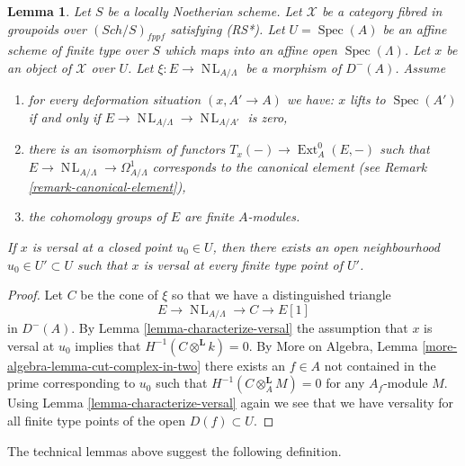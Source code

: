 \documentclass{stacks-project}
\theoremstyle{plain}
\newtheorem{lemma}[subsection]{Lemma}
\theoremstyle{definition}
\theoremstyle{remark}
\numberwithin{equation}{subsection}
\def\Spec{\mathop{\mathrm{Spec}}}
\def\Ext{\mathop{\mathrm{Ext}}\nolimits}
\def\Sch{\mathit{Sch}}
\def\NL{\mathop{N\!L}\nolimits}
\begin{document}
\begin{lemma}
\label{lemma-openness}
Let $S$ be a locally Noetherian scheme. Let $\mathcal{X}$ be a category
fibred in groupoids over $(\Sch/S)_{fppf}$ satisfying (RS*).
Let $U = \Spec(A)$ be an affine scheme of finite type over $S$ which maps
into an affine open $\Spec(\Lambda)$. Let $x$ be an object of $\mathcal{X}$
over $U$. Let $\xi : E \to \NL_{A/\Lambda}$ be a morphism of $D^{-}(A)$.
Assume
\begin{enumerate}
\item[(i)] for every deformation situation $(x, A' \to A)$ we have:
$x$ lifts to $\Spec(A')$ if and only if
$E \to \NL_{A/\Lambda} \to \NL_{A/A'}$ is zero,
\item[(ii)] there is an isomorphism of functors
$T_x(-) \to \Ext^0_A(E, -)$
such that $E \to \NL_{A/\Lambda} \to \Omega^1_{A/\Lambda}$
corresponds to the canonical element (see
Remark \ref{remark-canonical-element}),
\item[(iii)] the cohomology groups of $E$ are finite $A$-modules.
\end{enumerate}
If $x$ is versal at a closed point $u_0 \in U$,
then there exists an open neighbourhood $u_0 \in U' \subset U$
such that $x$ is versal at every finite type point of $U'$.
\end{lemma}

\begin{proof}
Let $C$ be the cone of $\xi$ so that we have a distinguished triangle
$$
E \to \NL_{A/\Lambda} \to C \to E[1]
$$
in $D^{-}(A)$. By Lemma \ref{lemma-characterize-versal}
the assumption that $x$ is versal at $u_0$ implies that
$H^{-1}(C \otimes^\mathbf{L} k) = 0$. By
More on Algebra, Lemma \ref{more-algebra-lemma-cut-complex-in-two}
there exists an $f \in A$ not contained in the prime corresponding to
$u_0$ such that $H^{-1}(C \otimes^\mathbf{L}_A M) = 0$ for
any $A_f$-module $M$. Using
Lemma \ref{lemma-characterize-versal}
again we see that we have versality for all finite type points of
the open $D(f) \subset U$.
\end{proof}

\noindent
The technical lemmas above suggest the following definition.
\end{document}
